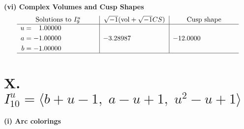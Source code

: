\documentclass[1p]{elsarticle_modified}
\theoremstyle{definition}
\newcommand{\I}{\sqrt{-1}}
\begin{document}
\newpage\flushleft \textbf{(vi) Complex Volumes and Cusp Shapes}
$$\begin{array}{c|c|c}  
\text{Solutions to }I^u_{9}& \I (\text{vol} + \sqrt{-1}CS) & \text{Cusp shape}\\
 \hline 
\begin{aligned}
u &= \phantom{-}1.00000\phantom{ +0.000000I} \\
a &= -1.00000\phantom{ +0.000000I} \\
b &= -1.00000\phantom{ +0.000000I}\end{aligned}
 & -3.28987\phantom{ +0.000000I} & -12.0000\phantom{ +0.000000I}\\
 \hline 
 \end{array}$$\newpage\newpage\renewcommand{\arraystretch}{1}
\centering \section*{X. $I^u_{10}= \langle b+u-1,\;a- u+1,\;u^2- u+1 \rangle$}
\flushleft \textbf{(i) Arc colorings}\\
\end{document}
